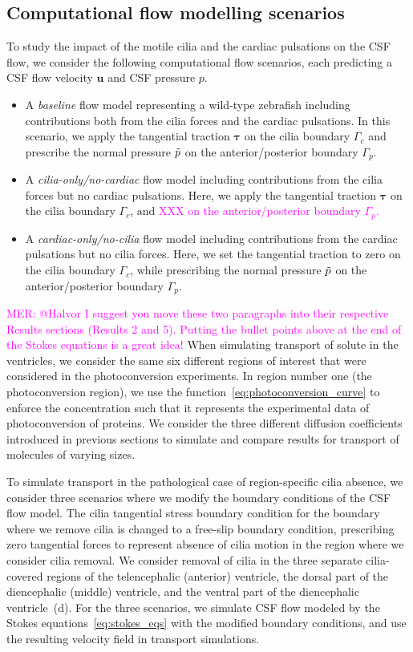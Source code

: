 \documentclass[fleqn]{wlscirep}
\newcommand{\Gc}{\Gamma_{c}}
\newcommand{\Gp}{\Gamma_{p}}
\newcommand{\uu}{\mathbf{u}}
\newcommand{\btau}{\bm{\tau}}
\newcommand{\mer}[1]{\textcolor{magenta}{#1}}
\begin{document}
\subsection*{Computational flow modelling scenarios}
To study the impact of the motile cilia and the cardiac pulsations on the CSF flow, we consider the following computational flow scenarios, each predicting a CSF flow velocity $\uu$ and CSF pressure $p$.
\begin{itemize}
    \item A \emph{baseline} flow model representing a wild-type zebrafish including contributions both from the cilia forces and the cardiac pulsations.
    In this scenario, we apply the tangential traction $\btau$ on the cilia boundary $\Gc$ and prescribe the normal pressure $\Tilde{p}$ on the anterior/posterior boundary $\Gp$. %

    \item A \emph{cilia-only/no-cardiac} flow model including contributions from the cilia forces but no cardiac pulsations.
    Here, we apply the tangential traction $\btau$ on the cilia boundary $\Gc$, and \mer{XXX on the anterior/posterior boundary $\Gp$.} %

    \item A \emph{cardiac-only/no-cilia} flow model including contributions from the cardiac pulsations but no cilia forces.
    Here, we set the tangential traction to zero on the cilia boundary $\Gc$, while prescribing the normal pressure $\Tilde{p}$ on the anterior/posterior boundary $\Gp$.  %
\end{itemize}

\mer{MER: @Halvor I suggest you move these two paragraphs into their respective Results sections (Results 2 and 5). Putting the bullet points above at the end of the Stokes equations is a great idea!}
When simulating transport of solute in the ventricles, we consider the same six different regions of interest that were considered in the photoconversion experiments. In region number one (the photoconversion region), we use the function~\eqref{eq:photoconversion_curve} to enforce the concentration such that it represents the experimental data of photoconversion of proteins. We consider the three different diffusion coefficients introduced in previous sections to simulate and compare results for transport of molecules of varying sizes.

To simulate transport in the pathological case of region-specific cilia absence, we consider three scenarios where we modify the boundary conditions of the CSF flow model.
The cilia tangential stress boundary condition for the boundary where we remove cilia is changed to a free-slip boundary condition,
prescribing zero tangential forces to represent absence of cilia motion in the region where we consider cilia removal.
We consider removal of cilia in the three separate cilia-covered regions of the telencephalic (anterior) ventricle, the dorsal part of the diencephalic (middle) ventricle,
and the ventral part of the diencephalic ventricle~(d). For the three scenarios, we simulate CSF flow modeled by the Stokes equations~\eqref{eq:stokes_eqs} with the modified boundary conditions,
and use the resulting velocity field in transport simulations.
\end{document}
